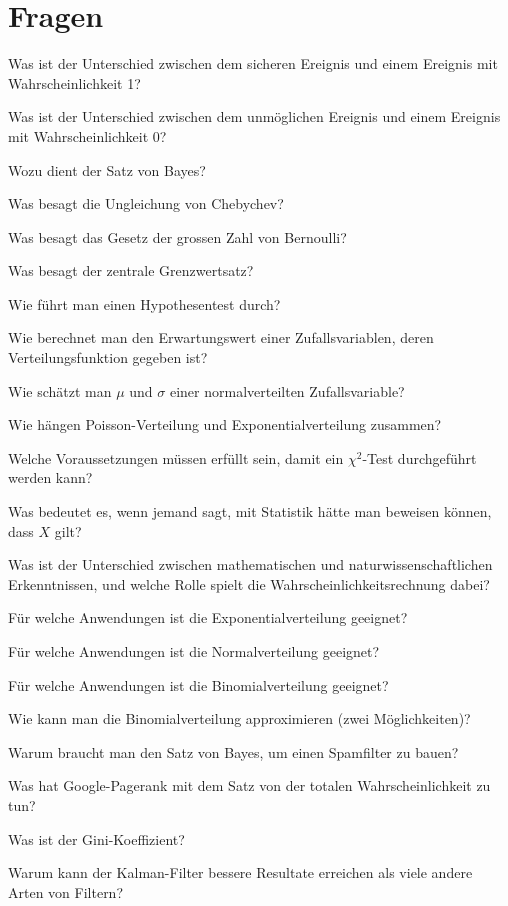 \documentclass[a4paper,12pt,twocolumn]{article}
\begin{document}
\section{Fragen}
\begin{compactenum}
\item Was ist der Unterschied zwischen dem sicheren Ereignis und
einem Ereignis mit Wahrscheinlichkeit 1?
\item Was ist der Unterschied zwischen dem unmöglichen Ereignis
und einem Ereignis mit Wahrscheinlichkeit 0?
\item Wozu dient der Satz von Bayes?
\item Was besagt die Ungleichung von Chebychev?
\item Was besagt das Gesetz der grossen Zahl von Bernoulli?
\item Was besagt der zentrale Grenzwertsatz?
\item Wie führt man einen Hypothesentest durch?
\item Wie berechnet man den Erwartungswert einer Zufallsvariablen, deren
Verteilungsfunktion gegeben ist?
\item Wie schätzt man $\mu$ und $\sigma$ einer normalverteilten
Zufallsvariable?
\item Wie hängen Poisson-Verteilung und Exponentialverteilung zusammen?
\item Welche Voraussetzungen müssen erfüllt sein, damit ein $\chi^2$-Test
durchgeführt werden kann?
\item Was bedeutet es, wenn jemand sagt, mit Statistik hätte man beweisen
können, dass $X$ gilt?
\item Was ist der Unterschied zwischen mathematischen und
naturwissenschaftlichen Erkenntnissen, und welche Rolle spielt die
Wahrscheinlichkeitsrechnung dabei?
\item Für welche Anwendungen ist die Exponentialverteilung geeignet?
\item Für welche Anwendungen ist die Normalverteilung geeignet?
\item Für welche Anwendungen ist die Binomialverteilung geeignet?
\item Wie kann man die Binomialverteilung approximieren (zwei Möglichkeiten)?
\item Warum braucht man den Satz von Bayes, um einen Spamfilter zu bauen?
\item Was hat Google-Pagerank mit dem Satz von der totalen Wahrscheinlichkeit
zu tun?
\item Was ist der Gini-Koeffizient?
\item Warum kann der Kalman-Filter bessere Resultate erreichen als viele
andere Arten von Filtern?
\end{compactenum}
\end{document}
